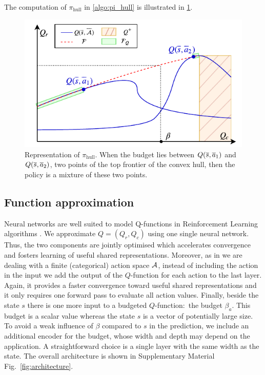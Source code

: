 \documentclass{article}
\begin{document}
The computation of $\pi_\text{hull}$ in \cref{algo:pi_hull} is illustrated in \cref{fig:hull}.

\begin{figure}
    \centering
    \includegraphics[width=\linewidth]{source/img/pi.pdf}
    \caption{Representation of $\pi_\text{hull}$. When the budget lies between $Q(\overline{s},\overline{a}_1)$ and $Q(\overline{s},\overline{a}_2)$, two points of the top frontier of the convex hull, then the policy is a mixture of these two points.}
    \label{fig:hull}
\end{figure}


\subsection{Function approximation}

Neural networks are well suited to model Q-functions in Reinforcement Learning algorithms \citep{Riedmiller2005,Mnih2015}.  We approximate $Q = (Q_r, Q_c)$ using one single neural network. Thus, the two components are jointly optimised which accelerates convergence and fosters learning of useful shared representations. Moreover, as in \citep{Mnih2015} we are dealing with a finite (categorical) action space $\mathcal{A}$, instead of including the action in the input we add the output of the $Q$-function for each action to the last layer. Again, it provides a faster convergence toward useful shared representations and it only requires one forward pass to evaluate all action values. Finally, beside the state $s$ there is one more input to a budgeted $Q$-function:~the budget $\beta_a$. This budget is a scalar value whereas the state $s$ is a vector of potentially large size. To avoid a weak influence of $\beta$ compared to $s$ in the prediction, we include an additional encoder for the budget, whose width and depth may depend on the application. A straightforward choice is a single layer with the same width as the state. The overall architecture is shown in Supplementary Material Fig.~\ref{fig:architecture}.
\end{document}
